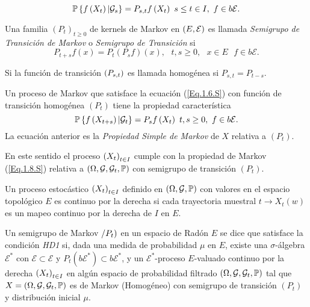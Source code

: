 \begin{equation}\label{Eq.1.6.S}
\mathbb{P}\left\{f\left(X_{t}\right)|\mathcal{G}_{s}\right\}=P_{s,t}f\left(X_{t}\right)\textrm{ }s\leq t\in I,\textrm{ }f\in b\mathcal{E}.
\end{equation}

\begin{Def}
Una familia $\left(P_{t}\right)_{t\geq0}$ de kernels de Markov en $\left(E,\mathcal{E}\right)$ es llamada {\em Semigrupo de Transici\'on de Markov} o {\em Semigrupo de Transici\'on} si
\[P_{t+s}f\left(x\right)=P_{t}\left(P_{s}f\right)\left(x\right),\textrm{ }t,s\geq0,\textrm{ }x\in E\textrm{ }f\in b\mathcal{E}.\]
\end{Def}
\begin{Note}
Si la funci\'on de transici\'on $\left(P_{s,t}\right)$ es llamada homog\'enea si $P_{s,t}=P_{t-s}$.
\end{Note}

Un proceso de Markov que satisface la ecuaci\'on (\ref{Eq.1.6.S}) con funci\'on de transici\'on homog\'enea $\left(P_{t}\right)$ tiene la propiedad caracter\'istica
\begin{equation}\label{Eq.1.8.S}
\mathbb{P}\left\{f\left(X_{t+s}\right)|\mathcal{G}_{t}\right\}=P_{s}f\left(X_{t}\right)\textrm{ }t,s\geq0,\textrm{ }f\in b\mathcal{E}.
\end{equation}
La ecuaci\'on anterior es la {\em Propiedad Simple de Markov} de $X$ relativa a $\left(P_{t}\right)$.

En este sentido el proceso $\left(X_{t}\right)_{t\in I}$ cumple con la propiedad de Markov (\ref{Eq.1.8.S}) relativa a $\left(\Omega,\mathcal{G},\mathcal{G}_{t},\mathbb{P}\right)$ con semigrupo de transici\'on $\left(P_{t}\right)$.
\begin{Def}
Un proceso estoc\'astico $\left(X_{t}\right)_{t\in I}$ definido en $\left(\Omega,\mathcal{G},\mathbb{P}\right)$ con valores en el espacio topol\'ogico $E$ es continuo por la derecha si cada trayectoria muestral $t\rightarrow X_{t}\left(w\right)$ es un mapeo continuo por la derecha de $I$ en $E$.
\end{Def}

\begin{Def}[HD1]\label{Eq.2.1.S}
Un semigrupo de Markov $\left/P_{t}\right)$ en un espacio de Rad\'on $E$ se dice que satisface la condici\'on {\em HD1} si, dada una medida de probabilidad $\mu$ en $E$, existe una $\sigma$-\'algebra $\mathcal{E^{*}}$ con $\mathcal{E}\subset\mathcal{E}$ y $P_{t}\left(b\mathcal{E}^{*}\right)\subset b\mathcal{E}^{*}$, y un $\mathcal{E}^{*}$-proceso $E$-valuado continuo por la derecha $\left(X_{t}\right)_{t\in I}$ en alg\'un espacio de probabilidad filtrado $\left(\Omega,\mathcal{G},\mathcal{G}_{t},\mathbb{P}\right)$ tal que $X=\left(\Omega,\mathcal{G},\mathcal{G}_{t},\mathbb{P}\right)$ es de Markov (Homog\'eneo) con semigrupo de transici\'on $(P_{t})$ y distribuci\'on inicial $\mu$.
\end{Def}

